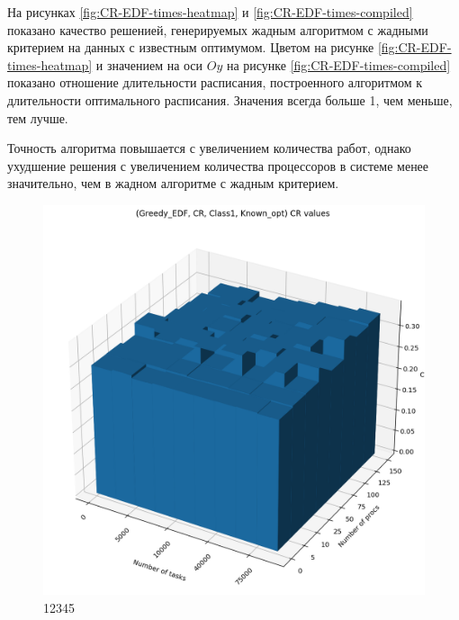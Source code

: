 На рисунках \ref{fig:CR-EDF-times-heatmap} и \ref{fig:CR-EDF-times-compiled} показано качество решенией, генерируемых жадным алгоритмом с жадными критерием на данных с известным оптимумом. Цветом на рисунке \ref{fig:CR-EDF-times-heatmap} и значением на оси $Oy$ на рисунке \ref{fig:CR-EDF-times-compiled} показано отношение длительности расписания, построенного алгоритмом к длительности оптимального расписания. Значения всегда больше 1, чем меньше, тем лучше.

Точность алгоритма повышается с увеличением количества работ, однако ухудшение решения с увеличением количества процессоров в системе менее значительно, чем в жадном алгоритме с жадным критерием. 

\begin{figure}[!htbp]
    \centering
    \includegraphics[width=\textwidth]{imgs/ideal_1/CR_EDF/cr_3d.png}
    \caption{12345}
\end{figure}

